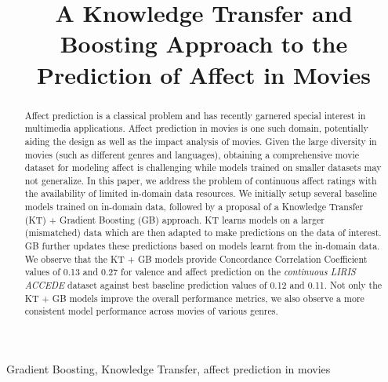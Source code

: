 \documentclass{article}
\title{A Knowledge Transfer and Boosting Approach to the Prediction of Affect in Movies}
\begin{document}
\ninept
%
\maketitle
%
\begin{abstract}
Affect prediction is a classical problem and has recently garnered special interest in multimedia applications. 
Affect prediction in movies is one such domain, potentially aiding the design as well as the impact analysis of movies.
Given the large diversity in movies (such as different genres and languages), obtaining a comprehensive movie dataset for modeling affect is challenging while models trained on smaller datasets may not generalize. 
In this paper, we address the problem of continuous affect ratings with the availability of limited in-domain data resources. 
We initially setup several baseline models trained on in-domain data, followed by a proposal of a Knowledge Transfer (KT) + Gradient Boosting (GB) approach.
KT learns models on a larger (mismatched) data which are then adapted to make predictions on the data of interest. 
GB further updates these predictions based on models learnt from the in-domain data.
We observe that the KT + GB models provide Concordance Correlation Coefficient values of 0.13 and 0.27 for valence and affect prediction on the {\it continuous LIRIS ACCEDE} dataset against best baseline prediction values of 0.12 and 0.11. 
Not only the KT + GB models improve the overall performance metrics, we also observe a more consistent model performance across movies of various genres. 
 
\end{abstract}
%
\begin{keywords}
Gradient Boosting, Knowledge Transfer, affect prediction in movies 
\end{keywords}
%
\end{document}
